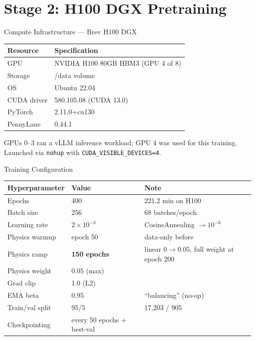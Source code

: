 \documentclass[aspectratio=169]{beamer}
\begin{document}
\section{Stage 2: H100 DGX Pretraining}

\begin{frame}{Compute Infrastructure --- Brev H100 DGX}
\begin{table}
\centering
\small
\begin{tabular}{ll}
\toprule
Resource & Specification \\
\midrule
GPU & NVIDIA H100 80GB HBM3 (GPU 4 of 8) \\
Storage & /data volume \\
OS & Ubuntu 22.04 \\
CUDA driver & 580.105.08 (CUDA 13.0) \\
PyTorch & 2.11.0+cu130 \\
PennyLane & 0.44.1 \\
\bottomrule
\end{tabular}
\end{table}

GPUs 0--3 ran a vLLM inference workload; GPU 4 was used for this training.
Launched via \texttt{nohup} with \texttt{CUDA\_VISIBLE\_DEVICES=4}.
\end{frame}

\begin{frame}{Training Configuration}
\begin{table}
\centering
\small
\begin{tabular}{lll}
\toprule
Hyperparameter & Value & Note \\
\midrule
Epochs & 400 & 221.2 min on H100 \\
Batch size & 256 & 68 batches/epoch \\
Learning rate & $2\times10^{-3}$ & CosineAnnealing $\to 10^{-6}$ \\
Physics warmup & epoch 50 & data-only before \\
Physics ramp & \textbf{150 epochs} & linear $0 \to 0.05$, full weight at epoch 200 \\
Physics weight & 0.05 (max) & \\
Grad clip & 1.0 (L2) & \\
EMA beta & 0.95 & ``balancing'' (no-op) \\
Train/val split & 95/5 & 17,203 / 905 \\
Checkpointing & every 50 epochs + best-val & \\
\bottomrule
\end{tabular}
\end{table}
\end{frame}
\end{document}
